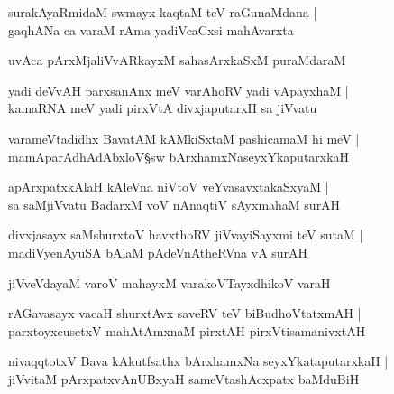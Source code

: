\begin{shloka}
surakAyaRmidaM swmayx kaqtaM teV raGunaMdana |\\
gaqhANa ca varaM rAma yadiVcaCxsi mahAvarxta
\end{shloka}

\begin{shloka}
uvAca pArxMjaliVvARkayxM sahasArxkaSxM puraMdaraM 
\end{shloka}

\begin{shloka}
yadi deVvAH parxsanAnx meV varAhoRV yadi vApayxhaM |\\
kamaRNA meV yadi pirxVtA divxjaputarxH sa jiVvatu
\end{shloka}

\begin{shloka}
varameVtadidhx BavatAM kAMkiSxtaM pashicamaM hi meV |\\
mamAparAdhAdAbxloV\S sw bArxhamxNaseyxYkaputarxkaH 
\end{shloka}

\begin{shloka}
apArxpatxkAlaH kAleVna niVtoV veYvasavxtakaSxyaM |\\
sa saMjiVvatu BadarxM voV nAnaqtiV sAyxmahaM surAH 
\end{shloka}

\begin{shloka}
divxjasayx saMshurxtoV havxthoRV jiVvayiSayxmi teV sutaM |\\
madiVyenAyuSA bAlaM pAdeVnAtheRVna vA surAH 
\end{shloka}

\begin{shloka}
jiVveVdayaM varoV mahayxM varakoVTayxdhikoV varaH 
\end{shloka}

\begin{shloka}
rAGavasayx vacaH shurxtAvx saveRV teV biBudhoVtatxmAH |\\
parxtoyxcusetxV mahAtAmxnaM pirxtAH pirxVtisamanivxtAH 
\end{shloka}

\begin{shloka}
nivaqqtotxV Bava kAkutfsathx bArxhamxNa seyxYkataputarxkaH |\\
jiVvitaM pArxpatxvAnUBxyaH sameVtashAcxpatx baMduBiH 
\end{shloka}

